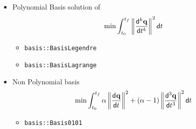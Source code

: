 \begin{frame}[fragile]
	\begin{itemize}
		\item Polynomial Basis solution of
		      \begin{eqnarray}
			      \min \int_{t_0}^{t_f} \left\|\frac{\mathsf{d}^{k} \mathbf{q}}{\mathsf{d} t^{k}}\right\|^2 \mathsf{d} t
		      \end{eqnarray}
		      \begin{itemize}
			      \item  \Verb|basis::BasisLegendre|
			      \item  \Verb|basis::BasisLagrange|
		      \end{itemize}
		\item Non Polynomial basis
		      \begin{eqnarray}
			      \min \int_{t_0}^{t_f} \alpha \left\|\frac{\mathsf{d}^{} \mathbf{q}}{\mathsf{d} t^{}}\right\|^2  + (\alpha - 1 )\left\|\frac{\mathsf{d}^{3} \mathbf{q}}{\mathsf{d} t^{3}}\right\|^2 \mathsf{d} t
		      \end{eqnarray}
		      \begin{itemize}
			      \item  \Verb|basis::Basis0101|
		      \end{itemize}
	\end{itemize}
\end{frame}

